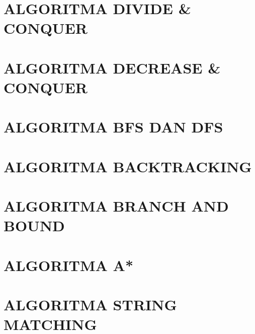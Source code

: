 \documentclass[12pt,a4paper]{article}
\begin{document}
\section{ALGORITMA DIVIDE \& CONQUER}




\clearpage

\section{ALGORITMA DECREASE \& CONQUER}




\clearpage

\section{ALGORITMA BFS DAN DFS}




\clearpage

\section{ALGORITMA BACKTRACKING}




\clearpage

\section{ALGORITMA BRANCH AND BOUND}




\clearpage

\section{ALGORITMA A*}




\clearpage

\section{ALGORITMA STRING MATCHING}




\clearpage

{}
\nocite{*}
\printbibliography[title={DAFTAR PUSTAKA}]
\clearpage
\end{document}
